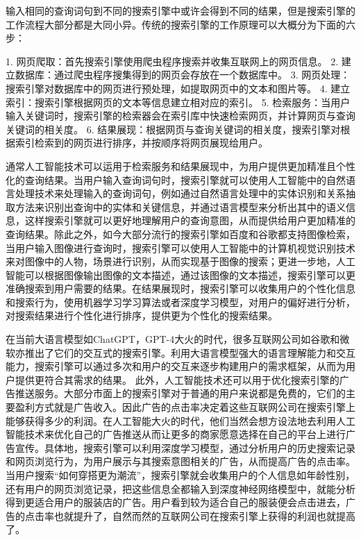 输入相同的查询词句到不同的搜索引擎中或许会得到不同的结果，但是搜索引擎的工作流程大部分都是大同小异。传统的搜索引擎的工作原理可以大概分为下面的六步：

1. 网页爬取：首先搜索引擎使用爬虫程序搜索并收集互联网上的网页信息。
2. 建立数据库：通过爬虫程序搜集得到的网页会存放在一个数据库中。
3. 网页处理：搜索引擎对数据库中的网页进行预处理，如提取网页中的文本和图片等。
4. 建立索引：搜索引擎根据网页的文本等信息建立相对应的索引。
5. 检索服务：当用户输入关键词时，搜索引擎的检索器会在索引库中快速检索网页，并计算网页与查询关键词的相关度。
6. 结果展现：根据网页与查询关键词的相关度，搜索引擎对根据索引检索到的网页进行排序，并按顺序将网页展现给用户。

通常人工智能技术可以运用于检索服务和结果展现中，为用户提供更加精准且个性化的查询结果。当用户输入查询词句时，搜索引擎就可以使用人工智能中的自然语言处理技术来处理输入的查询词句，例如通过自然语言处理中的实体识别和关系抽取方法来识别出查询中的实体和关键信息，并通过语言模型来分析出其中的语义信息，这样搜索引擎就可以更好地理解用户的查询意图，从而提供给用户更加精准的查询结果。除此之外，如今大部分流行的搜索引擎如百度和谷歌都支持图像检索，当用户输入图像进行查询时，搜索引擎可以使用人工智能中的计算机视觉识别技术来对图像中的人物，场景进行识别，从而实现基于图像的搜索；更进一步地，人工智能可以根据图像输出图像的文本描述，通过该图像的文本描述，搜索引擎可以更准确搜索到用户需要的结果。在结果展现时，搜索引擎可以收集用户的个性化信息和搜索行为，使用机器学习学习算法或者深度学习模型，对用户的偏好进行分析，对搜索结果进行个性化进行排序，提供更为个性化的搜索结果。

在当前大语言模型如ChatGPT，GPT-4大火的时代，很多互联网公司如谷歌和微软亦推出了它们的交互式的搜索引擎。利用大语言模型强大的语言理解能力和交互能力，搜索引擎可以通过多次和用户的交互来逐步构建用户的需求框架，从而为用户提供更符合其需求的结果。
此外，人工智能技术还可以用于优化搜索引擎的广告推送服务。大部分市面上的搜索引擎对于普通的用户来说都是免费的，它们的主要盈利方式就是广告收入。因此广告的点击率决定着这些互联网公司在搜索引擎上能够获得多少的利润。在人工智能大火的时代，他们当然会想方设法地去利用人工智能技术来优化自己的广告推送从而让更多的商家愿意选择在自己的平台上进行广告宣传。具体地，搜索引擎可以利用深度学习模型，通过分析用户的历史搜索记录和网页浏览行为，为用户展示与其搜索意图相关的广告，从而提高广告的点击率。当用户搜索“如何穿搭更为潮流”，搜索引擎就会收集用户的个人信息如年龄性别，还有用户的网页浏览记录，把这些信息全都输入到深度神经网络模型中，就能分析得到更适合用户的服装店的广告。用户看到较为适合自己的服装便会点击进去，广告的点击率也就提升了，自然而然的互联网公司在搜索引擎上获得的利润也就提高了。

